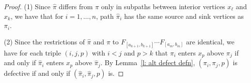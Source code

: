 \documentclass[12pt]{amsart}
\theoremstyle{definition}
\numberwithin{equation}{section}
\newcommand{\ctr}[1]{{x}_{#1}}
\newcommand{\trunc}[1]{\mathrm{trunc}_{#1}}
\newcommand{\type}{\mathrm{type}}
\begin{document}
\begin{proof}
    
    (1) Since $\hat \pi$ differs from $\pi$ only in subpaths between interior vertices $\ctr \ell$ and $x_k$, we have that for $i =1, \dotsc, n$,
    path $\hat \pi_i$ has the same source and sink vertices as $\pi_i$.  

(2) %
Since the restrictions of $\hat\pi$ 
and $\pi$ to $F_{[a_{k+1}, b_{k+1}]} \cdots F_{[a_m, b_m]}$ are identical, we have for each triple $(i,j,p)$ with $i < j$ and $p > k$ that $\pi_i$ enters $\ctr p$ above $\pi_j$ if and only if $\hat \pi_i$ enters $\ctr p$ above $\hat \pi_j$.
By Lemma~\ref{l: alt defect defn}, $(\pi_i,\pi_j,p)$ is defective if and only if $(\hat\pi_i, \hat\pi_j, p)$ is.
\end{proof}
\end{document}
